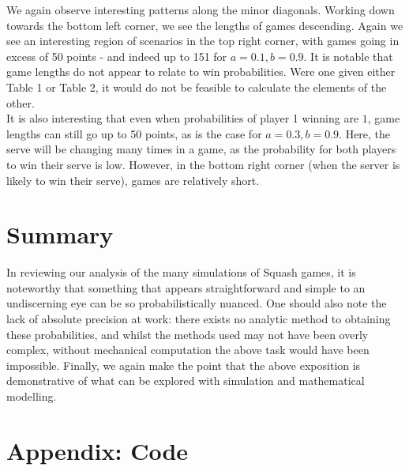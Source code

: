 \documentclass[a4paper, 11pt, oneside]{article}
\begin{document}
We again observe interesting patterns along the minor diagonals.  Working down towards the bottom left corner, we see the lengths of games descending.  Again we see an interesting region of scenarios in the top right corner, with games going in excess of 50 points - and indeed up to 151 for $a=0.1, b=0.9$.  It is notable that game lengths do not appear to relate to win probabilities.  Were one given either Table 1 or Table 2, it would do not be feasible to calculate the elements of the other.\\

It is also interesting that even when probabilities of player 1 winning are $1$, game lengths can still go up to 50 points, as is the case for $a=0.3, b=0.9$.  Here, the serve will be changing many times in a game, as the probability for both players to win their serve is low.  However, in the bottom right corner (when the server is likely to win their serve), games are relatively short.

\section{Summary}

In reviewing our analysis of the many simulations of Squash games, it is noteworthy that something that appears straightforward and simple to an undiscerning eye can be so probabilistically nuanced.  One should also note the lack of absolute precision at work: there exists no analytic method to obtaining these probabilities, and whilst the methods used may not have been overly complex, without mechanical computation the above task would have been impossible.  Finally, we again make the point that the above exposition is demonstrative of what can be explored with simulation and mathematical modelling.



\newpage

\section{Appendix: Code}
\end{document}
